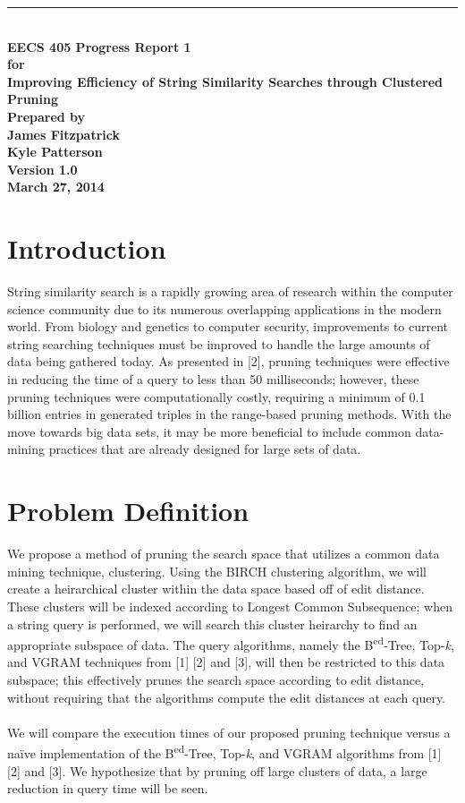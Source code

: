 \documentclass[pdftex,12pt,letter]{article}
\newcommand{\HRule}{\rule{\linewidth}{0.5mm}}
\begin{document}
\begin{titlepage}
\begin{flushright}
\HRule \\[0.4cm]
{ \bfseries
{\huge EECS 405 Progress Report 1\\[1cm]}
{\Large for\\[1cm]}
{\large Improving Efficiency of String Similarity Searches through Clustered Pruning\\[3cm]}
{\large Prepared by\\[1cm]James Fitzpatrick\\Kyle Patterson\\[2cm]
Version 1.0\\
March 27, 2014\\
}}
\end{flushright}
\end{titlepage}

\tableofcontents
\newpage

\section{Introduction}
String similarity search is a rapidly growing area of research within the computer science community due to its numerous overlapping applications in the modern world. From biology and genetics to computer security, improvements to current string searching techniques must be improved to handle the large amounts of data being gathered today.  As presented in [2], pruning techniques were effective in reducing the time of a query to less than 50 milliseconds; however, these pruning techniques were computationally costly, requiring a minimum of 0.1 billion entries in generated triples in the range-based pruning methods. With the move towards big data sets, it may be more beneficial to include common data-mining practices that are already designed for large sets of data.

\section{Problem Definition}
We propose a method of pruning the search space that utilizes a common data mining technique, clustering. Using the BIRCH clustering algorithm, we will create a heirarchical cluster within the data space based off of edit distance. These clusters will be indexed according to Longest Common Subsequence; when a string query is performed, we will search this cluster heirarchy to find an appropriate subspace of data. The query algorithms, namely the B\textsuperscript{ed}-Tree, Top-\textit{k}, and VGRAM techniques from [1] [2] and [3], will then be restricted to this data subspace; this effectively prunes the search space according to edit distance, without requiring that the algorithms compute the edit distances at each query. \\
\\
We will compare the execution times of our proposed pruning technique versus a na\"{i}ve implementation of the B\textsuperscript{ed}-Tree, Top-\textit{k}, and VGRAM algorithms from [1] [2] and [3]. We hypothesize that by pruning off large clusters of data, a large reduction in query time will be seen.
\end{document}
